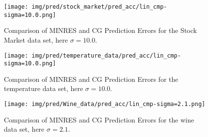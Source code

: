 
\begin{figure}[ht]
    \centering
    \texttt{[image: img/pred/stock\_market/pred\_acc/lin\_cmp-sigma=10.0.png]}
    \caption{Comparison of MINRES and CG Prediction Errors for the Stock Market data set, here $\sigma=10.0$.}
    \label{fig: minres-cg-stock_market-ferr}
\end{figure}


\begin{figure}[ht]
    \centering
    \texttt{[image: img/pred/temperature\_data/pred\_acc/lin\_cmp-sigma=10.0.png]}
    \caption{Comparison of MINRES and CG Prediction Errors for the temperature data set, here $\sigma=10.0$.}
    \label{fig: minres-cg-temperature_data-ferr}
\end{figure}


\begin{figure}[ht]
    \centering
    \texttt{[image: img/pred/Wine\_data/pred\_acc/lin\_cmp-sigma=2.1.png]}
    \caption{Comparison of MINRES and CG Prediction Errors for the wine data set, here $\sigma=2.1$.}
    \label{fig: minres-cg-Wine_data-ferr}
\end{figure}

\clearpage
